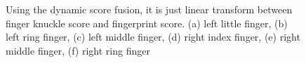 \begin{figure}[ht!]
    \caption{Using the dynamic score fusion, it is just linear transform between finger knuckle score and fingerprint score. (a) left little finger, (b) left ring finger, (c) left middle finger, (d) right index finger, (e) right middle finger, (f) right ring finger}
    \label{dynamic}
\end{figure}


